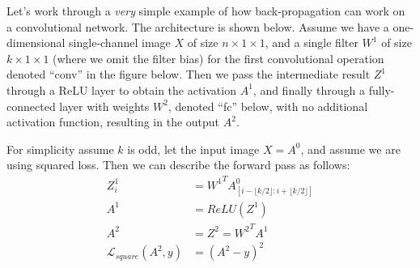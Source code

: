 Let's work through a {\em very} simple example of how back-propagation
can work on a convolutional network.   The architecture is shown
below.   Assume we have a one-dimensional single-channel image $X$ of
size $n \times 1 \times 1$, and a single filter $W^1$ of size $k \times 1 \times 1$
(where we omit the filter bias)
for the first convolutional operation denoted ``conv'' in the figure below.
Then we pass the intermediate result $Z^1$
through a ReLU layer to obtain the activation $A^1$,
and finally through a
fully-connected layer with weights $W^2$, denoted ``fc'' below, with no additional
activation function, resulting in the output $A^2$.

\begin{center}
\end{center}

For simplicity assume $k$ is odd, let the input image $X = A^0$, and
assume we are using squared loss.   Then we can describe the forward
pass as follows:
\begin{align*}
  Z_i^1                        & = {W^1}^TA^0_{[i-\lfloor k/2 \rfloor
  : i + \lfloor k/2 \rfloor]}                                         \\
  A^1                          & = ReLU(Z^1)                          \\
  A^2                          & = Z^2 = {W^2}^T A^1                  \\
  \mathcal{L}_{square}(A^2, y) & = (A^2-y)^2
\end{align*}

